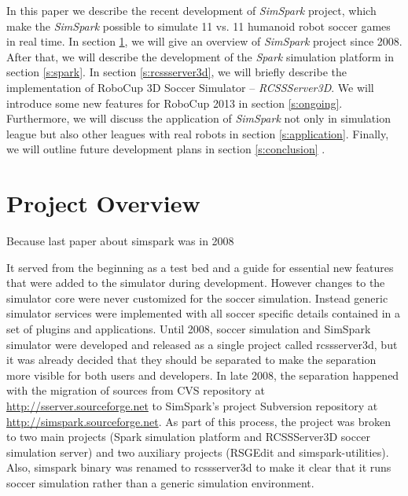 \documentclass{llncs}
\begin{document}
In this paper we describe the recent development of \textit{SimSpark} project, which make the \textit{SimSpark} possible to simulate 11 vs. 11 humanoid robot soccer games in real time.
In section \ref{s:overview}, we will give an overview of \textit{SimSpark} project since 2008. After that, we will describe the development of the \textit{Spark} simulation platform in section \ref{s:spark}.
In section \ref{s:rcssserver3d}, we will briefly describe the implementation of RoboCup 3D Soccer Simulator -- \textit{RCSSServer3D}.
We will introduce some new features for RoboCup 2013 in section \ref{s:ongoing}.
Furthermore, we will discuss the application of \textit{SimSpark} not only in simulation league but also other leagues with real robots in section \ref{s:application}.
Finally, we will outline future development plans in section \ref{s:conclusion} .



\section{Project Overview}
\label{s:overview}
Because last paper about simspark was in 2008

It served from the beginning as a test bed and a guide for essential new features that were added to the simulator during development. However changes to the simulator core were never customized for the soccer simulation. Instead generic simulator services were implemented with all soccer specific details contained in a set of plugins and applications. Until 2008, soccer simulation and SimSpark simulator were developed and released as a single project called rcssserver3d, but it was already decided that they should be separated 
to make the separation more visible for both users and developers. 
In late 2008, the separation happened with the migration of sources from CVS repository
at \url{http://sserver.sourceforge.net} to SimSpark's project Subversion repository at 
\url{http://simspark.sourceforge.net}. As part of this process, the project was broken
to two main projects (Spark simulation platform and RCSSServer3D soccer simulation server) 
and two auxiliary projects (RSGEdit and simspark-utilities). Also, simspark binary was 
renamed to rcssserver3d to make it clear that it runs soccer simulation rather than a 
generic simulation environment.
\end{document}
